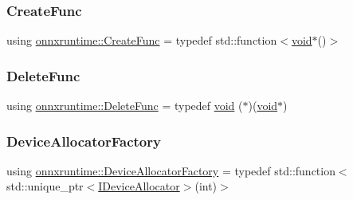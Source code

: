 \mbox{\label{namespaceonnxruntime_a4e4e007092b50ccad0f64e24d7ac3c1e}} 
\subsubsection{\texorpdfstring{Create\+Func}{CreateFunc}}
{\footnotesize\ttfamily using \mbox{\hyperlink{namespaceonnxruntime_a4e4e007092b50ccad0f64e24d7ac3c1e}{onnxruntime\+::\+Create\+Func}} = typedef std\+::function$<$\mbox{\hyperlink{mlasi_8h_a88f941d423cb2a819b70a1358982b1a6}{void}}$\ast$()$>$}

\mbox{\label{namespaceonnxruntime_a8dcea0e1aa8476e3d09d5a44a0ca4516}} 
\subsubsection{\texorpdfstring{Delete\+Func}{DeleteFunc}}
{\footnotesize\ttfamily using \mbox{\hyperlink{namespaceonnxruntime_a8dcea0e1aa8476e3d09d5a44a0ca4516}{onnxruntime\+::\+Delete\+Func}} = typedef \mbox{\hyperlink{mlasi_8h_a88f941d423cb2a819b70a1358982b1a6}{void}} ($\ast$)(\mbox{\hyperlink{mlasi_8h_a88f941d423cb2a819b70a1358982b1a6}{void}}$\ast$)}

\mbox{\label{namespaceonnxruntime_ae1af56abbcfb3524284e0de4567f94ac}} 
\subsubsection{\texorpdfstring{Device\+Allocator\+Factory}{DeviceAllocatorFactory}}
{\footnotesize\ttfamily using \mbox{\hyperlink{namespaceonnxruntime_ae1af56abbcfb3524284e0de4567f94ac}{onnxruntime\+::\+Device\+Allocator\+Factory}} = typedef std\+::function$<$std\+::unique\+\_\+ptr$<$\mbox{\hyperlink{classonnxruntime_1_1IDeviceAllocator}{I\+Device\+Allocator}}$>$(int)$>$}

\mbox{\label{namespaceonnxruntime_ab773a024322804641f5eb4964e3471d6}} 
